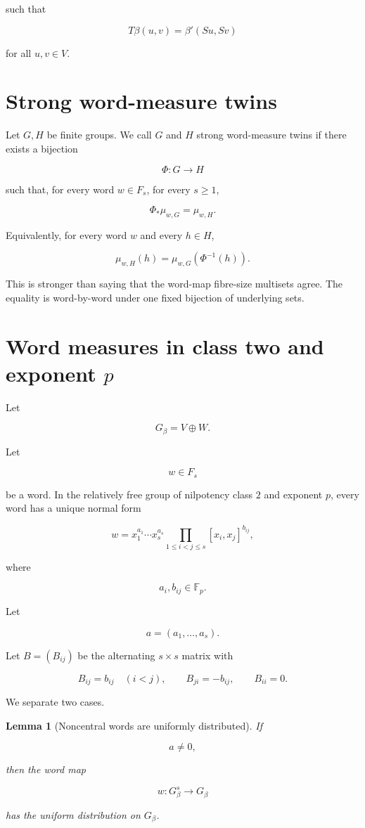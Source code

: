 \documentclass[11pt]{article}
\newtheorem{lemma}[theorem]{Lemma}
\begin{document}
such that

\[
T\beta(u,v)=\beta'(Su,Sv)
\]

for all $u,v\in V$.

\section{Strong word-measure twins}

Let $G,H$ be finite groups. We call $G$ and $H$ strong word-measure twins if there exists a bijection

\[
\Phi:G\to H
\]

such that, for every word $w\in F_s$, for every $s\ge1$,

\[
\Phi_*\mu_{w,G}=\mu_{w,H}.
\]

Equivalently, for every word $w$ and every $h\in H$,

\[
\mu_{w,H}(h)
=\mu_{w,G}(\Phi^{-1}(h)).
\]

This is stronger than saying that the word-map fibre-size multisets agree. The equality is word-by-word under one fixed bijection of underlying sets.

\section{Word measures in class two and exponent $p$}

Let

\[
G_\beta=V\oplus W.
\]

Let

\[
w\in F_s
\]

be a word. In the relatively free group of nilpotency class $2$ and exponent $p$, every word has a unique normal form

\[
w
=x_1^{a_1}\cdots x_s^{a_s}
\prod_{1\le i<j\le s}[x_i,x_j]^{b_{ij}},
\]

where

\[
a_i,b_{ij}\in\mathbb F_p.
\]

Let

\[
a=(a_1,\ldots,a_s).
\]

Let $B=(B_{ij})$ be the alternating $s\times s$ matrix with

\[
B_{ij}=b_{ij}\quad(i<j),
\qquad
B_{ji}=-b_{ij},
\qquad
B_{ii}=0.
\]

We separate two cases.

\begin{lemma}[Noncentral words are uniformly distributed]
If

\[
a\neq0,
\]

then the word map

\[
w:G_\beta^s\to G_\beta
\]

has the uniform distribution on $G_\beta$.

\end{lemma}
\end{document}
